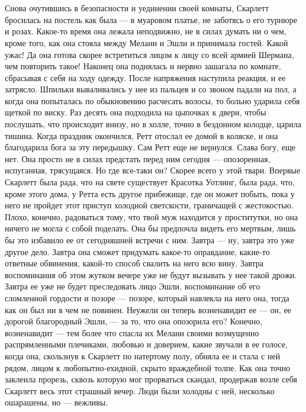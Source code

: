 \chapter{\ }

Снова очутившись в безопасности и уединении своей комнаты, Скарлетт бросилась на постель как была — в муаровом платье, не заботясь о его турнюре и розах. Какое-то время она лежала неподвижно, не в силах думать ни о чем, кроме того, как она стояла между Мелани и Эшли и принимала гостей. Какой ужас! Да она готова скорее встретиться лицом к лицу со всей армией Шермана, чем повторить такое! Наконец она поднялась и нервно зашагала по комнате, сбрасывая с себя на ходу одежду.
После напряжения наступила реакция, и ее затрясло. Шпильки вываливались у нее из пальцев и со звоном падали на пол, а когда она попыталась по обыкновению расчесать волосы, то больно ударила себя щеткой по виску. Раз десять она подходила на цыпочках к двери, чтобы послушать, что происходит внизу, но в холле, точно в бездонном колодце, царила тишина.
Когда праздник окончился, Ретт отослал ее домой в коляске, и она благодарила бога за эту передышку. Сам Ретт еще не вернулся. Слава богу, еще нет. Она просто не в силах предстать перед ним сегодня — опозоренная, испуганная, трясущаяся. Но где все-таки он? Скорее всего у этой твари. Впервые Скарлетт была рада, что на свете существует Красотка Уотлинг, была рада, что, кроме этого дома, у Ретта есть другое прибежище, где он может побыть, пока у него не пройдет этот приступ холодной светскости, граничащей с жестокостью. Плохо, конечно, радоваться тому, что твой муж находится у проститутки, но она ничего не могла с собой поделать. Она бы предпочла видеть его мертвым, лишь бы это избавило ее от сегодняшней встречи с ним.
Завтра — ну, завтра это уже другое дело. Завтра она сможет придумать какое-то оправдание, какие-то ответные обвинения, какой-то способ свалить на него всю вину. Завтра воспоминания об этом жутком вечере уже не будут вызывать у нее такой дрожи. Завтра ее уже не будет преследовать лицо Эшли, воспоминание об его сломленной гордости и позоре — позоре, который навлекла на него она, тогда как он был ни в чем не повинен. Неужели он теперь возненавидит ее — он, ее дорогой благородный Эшли, — за то, что она опозорила его? Конечно, возненавидит — тем более что спасла их Мелани своими возмущенно распрямленными плечиками, любовью и доверием, какие звучали в ее голосе, когда она, скользнув к Скарлетт по натертому полу, обняла ее и стала с ней рядом, лицом к любопытно-ехидной, скрыто враждебной толпе. Как она точно заклеила прорезь, сквозь которую мог прорваться скандал, продержав возле себя Скарлетт весь этот страшный вечер. Люди были холодны с ней, несколько ошарашены, но — вежливы.
